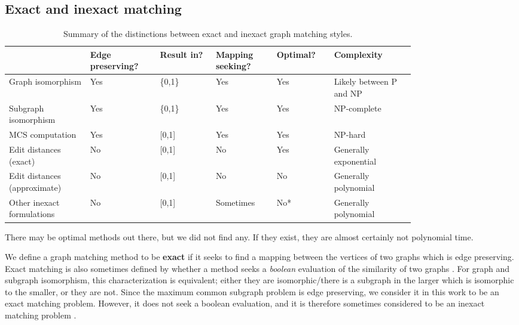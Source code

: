 \documentclass[12pt]{thesis}
\theoremstyle{plain}
\theoremstyle{definition}
\theoremstyle{remark}
\begin{document}
\subsection{Exact and inexact matching}\label{section:exact_and_inexact_matching}

\begin{table}[h]
\centering
\begin{tabular}{|L{0.16\linewidth}|L{0.13\linewidth}|L{0.11\linewidth}|L{0.12\linewidth}|L{0.105\linewidth}|L{0.165\linewidth}|}
\hline
 & Edge preserving? & Result in? & Mapping seeking? & Optimal? & Complexity \\ \hline
Graph isomorphism & Yes & \{0,1\} & Yes & Yes & Likely between P and NP \\ \hline
Subgraph isomorphism & Yes & \{0,1\} & Yes & Yes & NP-complete \\ \hline
MCS computation & Yes & [0,1] & Yes & Yes & NP-hard \\ \hline
Edit distances (exact) & No & [0,1] & No & Yes & Generally exponential \\ \hline
Edit distances (approximate) & No & [0,1] & No & No & Generally polynomial \\ \hline
Other inexact formulations & No & [0,1] & Sometimes & No* & Generally polynomial \\ \hline
\end{tabular}
\caption{Summary of the distinctions between exact and inexact graph matching styles.}
\footnotesize *There may be optimal methods out there, but we did not find any. If they exist, they are almost certainly not polynomial time.
\label{exact_vs_inexact}
\end{table}

We define a graph matching method to be \textbf{exact} if it seeks to find a mapping between the vertices of two graphs which is edge preserving. Exact matching is also sometimes defined by whether a method seeks a \textit{boolean} evaluation of the similarity of two graphs \cite{Livi_2012,Emmert_Streib_2016}. For graph and subgraph isomorphism, this characterization is equivalent; either they are isomorphic/there is a subgraph in the larger which is isomorphic to the smaller, or they are not. Since the maximum common subgraph problem is edge preserving, we consider it in this work to be an exact matching problem. However, it does not seek a boolean evaluation, and it is therefore sometimes considered to be an inexact matching problem \cite{Livi_2012}. 
\end{document}
